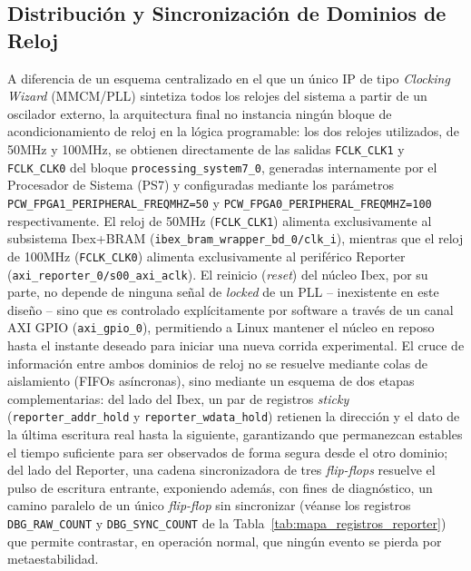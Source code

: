\subsection{Distribución y Sincronización de Dominios de Reloj}
\label{ssec:clock_wizard}
A diferencia de un esquema centralizado en el que un único IP de tipo
\textit{Clocking Wizard} (MMCM/PLL) sintetiza todos los relojes del
sistema a partir de un oscilador externo, la arquitectura final no
instancia ningún bloque de acondicionamiento de reloj en la lógica
programable: los dos relojes utilizados, de 50MHz y 100MHz, se obtienen
directamente de las salidas \texttt{FCLK\_CLK1} y \texttt{FCLK\_CLK0} del
bloque \texttt{processing\_system7\_0}, generadas internamente por el
Procesador de Sistema (PS7) y configuradas mediante los parámetros
\texttt{PCW\_FPGA1\_PERIPHERAL\_FREQMHZ=50} y
\texttt{PCW\_FPGA0\_PERIPHERAL\_FREQMHZ=100} respectivamente. El reloj de
50MHz (\texttt{FCLK\_CLK1}) alimenta exclusivamente al subsistema
Ibex+BRAM (\texttt{ibex\_bram\_wrapper\_bd\_0/clk\_i}), mientras que el
reloj de 100MHz (\texttt{FCLK\_CLK0}) alimenta exclusivamente al
periférico Reporter (\texttt{axi\_reporter\_0/s00\_axi\_aclk}). El reinicio
(\textit{reset}) del núcleo Ibex, por su parte, no depende de ninguna
señal de \textit{locked} de un PLL -- inexistente en este diseño -- sino
que es controlado explícitamente por software a través de un canal AXI
GPIO (\texttt{axi\_gpio\_0}), permitiendo a Linux mantener el núcleo en
reposo hasta el instante deseado para iniciar una nueva corrida
experimental. El cruce de información entre ambos dominios de reloj no se
resuelve mediante colas de aislamiento (FIFOs asíncronas), sino mediante
un esquema de dos etapas complementarias: del lado del Ibex, un par de
registros \textit{sticky} (\texttt{reporter\_addr\_hold} y
\texttt{reporter\_wdata\_hold}) retienen la dirección y el dato de la
última escritura real hasta la siguiente, garantizando que permanezcan
estables el tiempo suficiente para ser observados de forma segura desde
el otro dominio; del lado del Reporter, una cadena sincronizadora de tres
\textit{flip-flops} resuelve el pulso de escritura entrante, exponiendo
además, con fines de diagnóstico, un camino paralelo de un único
\textit{flip-flop} sin sincronizar (véanse los registros
\texttt{DBG\_RAW\_COUNT} y \texttt{DBG\_SYNC\_COUNT} de la
Tabla~\ref{tab:mapa_registros_reporter}) que permite contrastar, en
operación normal, que ningún evento se pierda por metaestabilidad.

